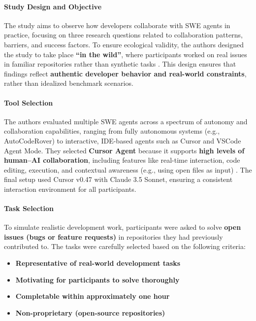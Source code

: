 \paragraph{Study Design and Objective}
The study aims to observe how developers collaborate with SWE agents in practice, focusing on three research questions related to collaboration patterns, barriers, and success factors. To ensure ecological validity, the authors designed the study to take place \textbf{“in the wild”}, where participants worked on real issues in familiar repositories rather than synthetic tasks \cite{liu2024llmagents}.  This design ensures that findings reflect \textbf{authentic developer behavior and real-world constraints}, rather than idealized benchmark scenarios.

\paragraph{Tool Selection}
The authors evaluated multiple SWE agents across a spectrum of autonomy and collaboration capabilities, ranging from fully autonomous systems (e.g., AutoCodeRover) to interactive, IDE-based agents such as Cursor and VSCode Agent Mode.  They selected \textbf{Cursor Agent} because it supports \textbf{high levels of human–AI collaboration}, including features like real-time interaction, code editing, execution, and contextual awareness (e.g., using open files as input) \cite{cursoragent}.  The final setup used Cursor v0.47 with Claude 3.5 Sonnet, ensuring a consistent interaction environment for all participants.

\paragraph{Task Selection}
To simulate realistic development work, participants were asked to solve \textbf{open issues (bugs or feature requests)} in repositories they had previously contributed to.  The tasks were carefully selected based on the following criteria:
\begin{itemize}
    \item \textbf{Representative of real-world development tasks}
    \item \textbf{Motivating for participants to solve thoroughly}
    \item \textbf{Completable within approximately one hour}
    \item \textbf{Non-proprietary (open-source repositories)}
\end{itemize}

